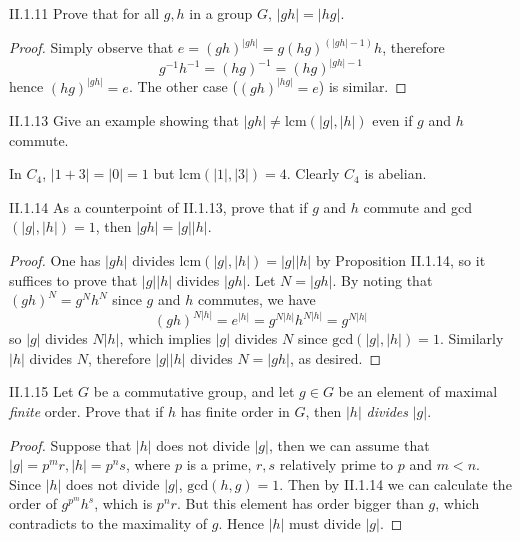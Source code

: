 \begin{problem}{II.1.11}
Prove that for all $g, h$ in a group $G$, $|gh| = |hg|$.
\end{problem}
\begin{proof}
Simply observe that $e = (gh)^{|gh|} = g(hg)^{(|gh|-1)}h$, therefore 
\[
g^{-1}h^{-1} = (hg)^{-1} = (hg)^{|gh|-1}
\]
hence $(hg)^{|gh|} = e$. The other case ($(gh)^{|hg|} = e$) is similar.
\end{proof}

\begin{problem}{II.1.13}
Give an example showing that $|gh| \neq \text{lcm}(|g|, |h|)$ even if $g$ and $h$ commute.
\end{problem}
\begin{solution}
In $C_4$, $|1 + 3| = |0| = 1$ but $\text{lcm}(|1|, |3|) = 4$. Clearly $C_4$ is abelian.
\end{solution}

\begin{problem}{II.1.14}
As a counterpoint of II.1.13, prove that if $g$ and $h$ commute and gcd$(|g|, |h|) = 1$, then $|gh| = |g||h|$. 
\end{problem}
\begin{proof}
One has $|gh|$ divides $\text{lcm}(|g|, |h|) = |g||h|$ by Proposition II.1.14, so it suffices to prove that $|g||h|$ divides $|gh|$. Let $N = |gh|$. By noting that $(gh)^N = g^Nh^N$ since $g$ and $h$ commutes, we have
\[
(gh)^{N|h|} = e^{|h|} = g^{N|h|}h^{N|h|} = g^{N|h|}
\]
so $|g|$ divides $N|h|$, which implies $|g|$ divides $N$ since $\text{gcd}(|g|, |h|) = 1$. Similarly $|h|$ divides $N$, therefore $|g||h|$ divides $N = |gh|$, as desired.
\end{proof}

\begin{problem}{II.1.15}
Let $G$ be a commutative group, and let $g\in G$ be an element of maximal \emph{finite} order. Prove that if $h$ has finite order in $G$, then $|h|$ \emph{divides} $|g|$.
\end{problem}
\begin{proof}
Suppose that $|h|$ does not divide $|g|$, then we can assume that $|g| = p^mr, |h| = p^ns$, where $p$ is a prime, $r, s$ relatively prime to $p$ and $m<n$. Since $|h|$ does not divide $|g|$, $\text{gcd}(h,g) = 1$. Then by II.1.14 we can calculate the order of $g^{p^m}h^s$, which is $p^nr$. But this element has order bigger than $g$, which contradicts to the maximality of $g$. Hence $|h|$ must divide $|g|$.
\end{proof}

